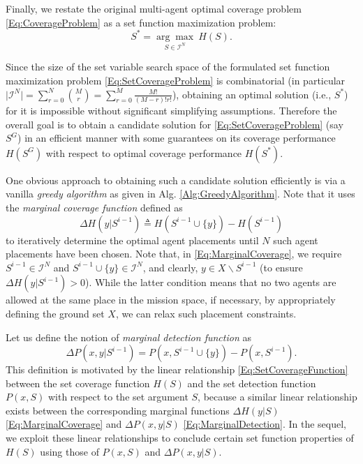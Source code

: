 \documentclass[letterpaper, 10 pt, conference]{ieeeconf}
\begin{document}
Finally, we restate the original multi-agent optimal coverage problem \eqref{Eq:CoverageProblem} as a set function maximization problem:
\begin{equation}\label{Eq:SetCoverageProblem}
S^* = \underset{S\in\mathcal{I}^N}{\arg\max}\ H(S).
\end{equation}

Since the size of the set variable search space of the formulated set function maximization problem \eqref{Eq:SetCoverageProblem} is combinatorial (in particular $\vert \mathcal{I}^N \vert = \sum_{r=0}^N {M \choose r} =  \sum_{r=0}^M \frac{M!}{(M-r)!r!}$), obtaining an optimal solution (i.e., $S^*$) for it is impossible without significant simplifying assumptions. Therefore the overall goal is to obtain a candidate solution for \eqref{Eq:SetCoverageProblem} (say $S^G$) in an efficient manner with some guarantees on its coverage performance $H(S^G)$ with respect to optimal coverage performance $H(S^*)$. 


One obvious approach to obtaining such a candidate solution efficiently is via a vanilla \emph{greedy algorithm} as given in Alg. \ref{Alg:GreedyAlgorithm}. Note that it uses the \emph{marginal coverage function} defined as
\begin{equation}\label{Eq:MarginalCoverage}
    \Delta H(y \vert S^{i-1}) \triangleq H(S^{i-1}\cup\{y\}) - H(S^{i-1})
\end{equation}
to iteratively determine the optimal agent placements until $N$ such agent placements have been chosen. Note that, in \eqref{Eq:MarginalCoverage}, we require $S^{i-1}\in\mathcal{I}^N$ and $S^{i-1}\cup\{y\} \in\mathcal{I}^N$, and clearly, $y \in X \backslash S^{i-1}$ (to ensure $\Delta H(y \vert S^{i-1})>0$). While the latter condition means that no two agents are allowed at the same place in the mission space, if necessary, by appropriately defining the ground set $X$, we can relax such placement constraints. 

Let us define the notion of \emph{marginal detection function} as
\begin{equation}\label{Eq:MarginalDetection}
    \Delta P(x, y \vert S^{i-1}) = P(x, S^{i-1}\cup\{y\}) - P(x, S^{i-1}).
\end{equation}
This definition is motivated by the linear relationship \eqref{Eq:SetCoverageFunction} between the set coverage function $H(S)$ and the set detection function $P(x,S)$ with respect to the set argument $S$, because a similar linear relationship exists between the corresponding marginal functions $\Delta H(y \vert S)$ \eqref{Eq:MarginalCoverage} and $\Delta P(x,y\vert S)$ \eqref{Eq:MarginalDetection}. In the sequel, we exploit these linear relationships to conclude certain set function properties of $H(S)$ using those of $P(x,S)$ and $\Delta P(x,y\vert S)$.
\end{document}
